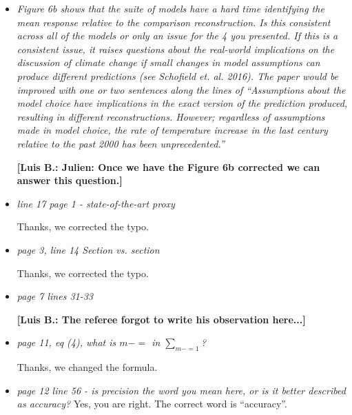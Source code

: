 \documentclass[11pt]{article}
\newcommand{\lb}[1]{\color{ForestGreen}\textbf{[Luis B.: #1]}\normalcolor}
\begin{document}
\begin{itemize}
\item \textit{Figure 6b shows that the suite of models have a hard time identifying
    the mean response relative to the comparison reconstruction. Is this
    consistent across all of the models or only an issue for the 4 you
    presented. If this is a consistent issue, it raises questions about the
    real-world implications on the discussion of climate change if small changes
    in model assumptions can produce different predictions (see Schofield et.
    al. 2016). The paper would be improved with one or two sentences along the
    lines of ``Assumptions about the model choice have implications in the exact
    version of the prediction produced, resulting in different reconstructions.
    However; regardless of assumptions made in model choice, the rate of
    temperature increase in the last century relative to the past 2000 has been unprecedented.''}

\lb{Julien: Once we have the Figure 6b corrected we can answer this question.}  
  
\item \textit{line 17 page 1 - state-of-the-art proxy}

Thanks, we corrected the typo.
  
\item \textit{page 3, line 14 Section vs. section}

  Thanks, we corrected the typo.
  
\item \textit{page 7 lines 31-33}

  \lb{The referee forgot to write his observation here...}
  
\item \textit{page 11, eq (4), what is \(m-=\) in \(\sum_{m-=1}\)?}

  Thanks, we changed the formula.
  
\item \textit{page 12 line 56 - is precision the word you mean here, or is it
    better described as accuracy?}
  Yes, you are right. The correct word is ``accuracy''.
\end{itemize}

%
%
\end{document}
